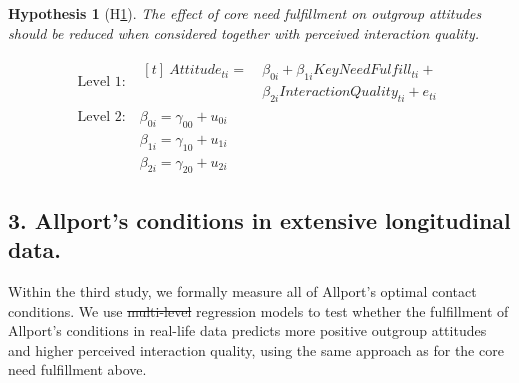 \documentclass[man, 12pt, a4paper, mask]{apa7}
\theoremstyle{break}
\theoremstyle{plain}
\newtheorem{subhyp}{Hypothesis}
\providecommand{\DIFaddtex}[1]{{\protect\color{blue}\uwave{#1}}} %
\providecommand{\DIFdeltex}[1]{{\protect\color{red}\sout{#1}}}                      %
\providecommand{\DIFaddbegin}{} %
\providecommand{\DIFaddend}{} %
\providecommand{\DIFdelbegin}{} %
\providecommand{\DIFdelend}{} %
\providecommand{\DIFadd}[1]{\texorpdfstring{\DIFaddtex{#1}}{#1}} %
\providecommand{\DIFdel}[1]{\texorpdfstring{\DIFdeltex{#1}}{}} %
\newcommand{\DIFscaledelfig}{0.5}
\newlength{\DIFdelgraphicswidth} %
\newlength{\DIFdelgraphicsheight} %
\newcommand{\DIFaddincludegraphics}[2][]{{\color{blue}\fbox{\DIFOincludegraphics[#1]{#2}}}} %
\newcommand{\DIFdelincludegraphics}[2][]{%
\sbox{\DIFdelgraphicsbox}{\DIFOincludegraphics[#1]{#2}}%
\settoboxwidth{\DIFdelgraphicswidth}{\DIFdelgraphicsbox} %
\settoboxtotalheight{\DIFdelgraphicsheight}{\DIFdelgraphicsbox} %
\scalebox{\DIFscaledelfig}{%
\parbox[b]{\DIFdelgraphicswidth}{\usebox{\DIFdelgraphicsbox}\\[-\baselineskip] \rule{\DIFdelgraphicswidth}{0em}}\llap{\resizebox{\DIFdelgraphicswidth}{\DIFdelgraphicsheight}{%
\setlength{\unitlength}{\DIFdelgraphicswidth}%
\begin{picture}(1,1)%
\thicklines\linethickness{2pt} %
{\color[rgb]{1,0,0}\put(0,0){\framebox(1,1){}}}%
{\color[rgb]{1,0,0}\put(0,0){\line( 1,1){1}}}%
{\color[rgb]{1,0,0}\put(0,1){\line(1,-1){1}}}%
\end{picture}%
}\hspace*{3pt}}} %
} %
\DeclareRobustCommand{\DIFaddbegin}{\DIFOaddbegin \let\includegraphics\DIFaddincludegraphics} %
\DeclareRobustCommand{\DIFaddend}{\DIFOaddend \let\includegraphics\DIFOincludegraphics} %
\DeclareRobustCommand{\DIFdelbegin}{\DIFOdelbegin \let\includegraphics\DIFdelincludegraphics} %
\DeclareRobustCommand{\DIFdelend}{\DIFOaddend \let\includegraphics\DIFOincludegraphics} %
\begin{document}
\begin{mdframed}[style=mdfhypothesis]
    \begin{subhyp}[H\ref{hyp:keyNeedMediation}] \label{hyp:keyNeedMediation}
    \addtolength{\leftskip}{\subhypskip}
    The effect of core need fulfillment on outgroup attitudes should be reduced when considered together with perceived interaction quality.
    \end{subhyp}

    \begin{fleqn}[\eqskip]
      \begin{equation} \label{eq:SlopesAttCoreQual}
        \begin{split}
          \textrm{Level 1:} &
            \begin{aligned}[t]
              \ Attitude_{ti} =  &\ \beta_{0i} + \beta_{1i}KeyNeedFulfill_{ti} + \\
                                 &\ \beta_{2i}InteractionQuality_{ti} + e_{ti}
            \end{aligned} \\
          \textrm{Level 2:} &\ \beta_{0i} = \gamma_{00} + u_{0i} \\
                            &\ \beta_{1i} = \gamma_{10} + u_{1i} \\
                            &\ \beta_{2i} = \gamma_{20} + u_{2i}
        \end{split} 
      \end{equation}
    \end{fleqn}
\end{mdframed}

\subsection{3. Allport's conditions in extensive longitudinal data.}
Within the third study, we formally measure all of Allport's optimal contact conditions. We use \DIFdelbegin \DIFdel{multi-level }\DIFdelend \DIFaddbegin \DIFadd{multilevel }\DIFaddend regression models to test whether the fulfillment of Allport's conditions in real-life data predicts more positive outgroup attitudes and higher perceived interaction quality, using the same approach as for the core need fulfillment above.
\end{document}
